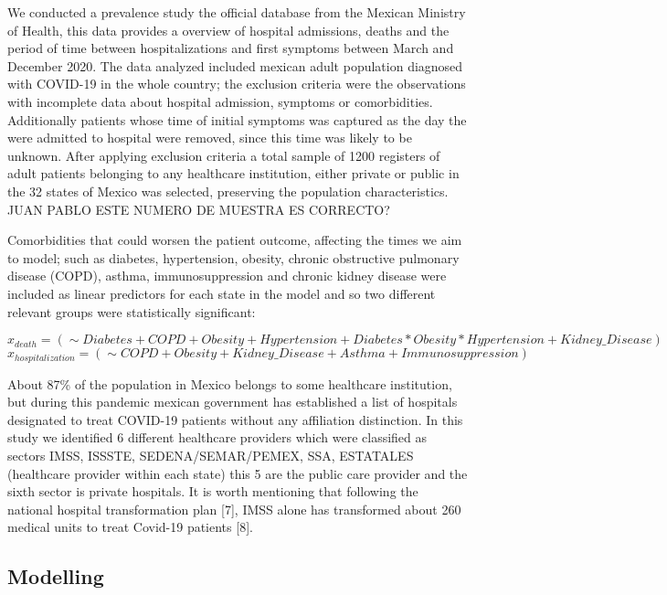 \documentclass[10pt,letterpaper]{article}
\begin{document}
We conducted a prevalence study the official database from the Mexican
Ministry of Health, this data provides a overview of hospital
admissions, deaths and the period of time between hospitalizations and
first symptoms between March and December 2020. The data analyzed
included mexican adult population diagnosed with COVID-19 in the whole
country; the exclusion criteria were the observations with incomplete
data about hospital admission, symptoms or comorbidities. Additionally
patients whose time of initial symptoms was captured as the day the were
admitted to hospital were removed, since this time was likely to be
unknown. After applying exclusion criteria a total sample of 1200
registers of adult patients belonging to any healthcare institution,
either private or public in the 32 states of Mexico was selected,
preserving the population characteristics. JUAN PABLO ESTE NUMERO DE
MUESTRA ES CORRECTO?

Comorbidities that could worsen the patient outcome, affecting the times
we aim to model; such as diabetes, hypertension, obesity, chronic
obstructive pulmonary disease (COPD), asthma, immunosuppression and
chronic kidney disease were included as linear predictors for each state
in the model and so two different relevant groups were statistically
significant:

\[x_{death} = (\sim Diabetes+COPD+Obesity+Hypertension+Diabetes*Obesity*Hypertension+Kidney\_Disease)\]
\[x_{hospitalization} = (\sim COPD+Obesity+Kidney\_Disease+Asthma+Immunosuppression)\]

About 87\% of the population in Mexico belongs to some healthcare
institution, but during this pandemic mexican government has established
a list of hospitals designated to treat COVID-19 patients without any
affiliation distinction. In this study we identified 6 different
healthcare providers which were classified as sectors IMSS, ISSSTE,
SEDENA/SEMAR/PEMEX, SSA, ESTATALES (healthcare provider within each
state) this 5 are the public care provider and the sixth sector is
private hospitals. It is worth mentioning that following the national
hospital transformation plan {[}7{]}, IMSS alone has transformed about
260 medical units to treat Covid-19 patients {[}8{]}.

\subsection{Modelling}\label{modelling}
\end{document}
